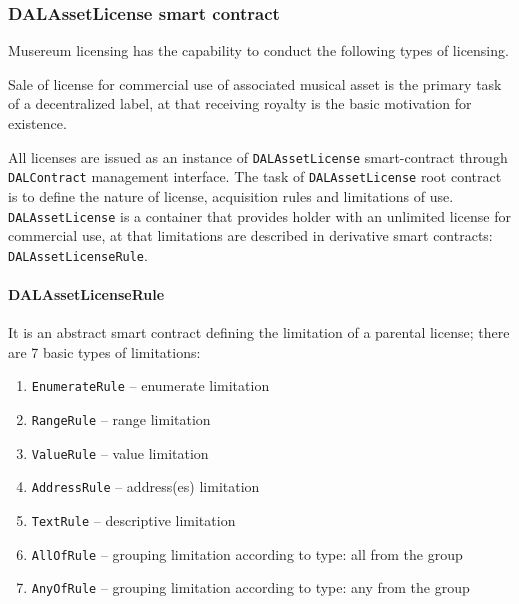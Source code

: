 \documentclass[12pt]{report}
\newcommand{\hlc}[1]{\colorbox{white!25}{#1}}
\def\code#1{\colorbox{light-gray}{\texttt{#1}}}
\begin{document}
\subsubsection{DALAssetLicense smart contract}
\label{tech-apps-dal-license}

Musereum licensing has the capability to conduct the following types of licensing.

Sale of license for commercial use of associated musical asset is the primary task of a decentralized label, at that receiving royalty is the basic motivation for existence.

All licenses are issued as \hlc{an instance} of \code{DALAssetLicense} smart-contract through \code{DALContract} management interface.
The task of \code{DALAssetLicense} root contract is to define the nature of license, acquisition rules and  limitations of use. \code{DALAssetLicense} is a container that provides holder with an unlimited license for commercial use, at that limitations are described in derivative smart contracts:
 \code{DALAssetLicenseRule}.

\paragraph{DALAssetLicenseRule}\hfill\null\linebreak
It is an abstract smart contract defining the limitation of a parental license; there are 7 basic types of limitations:
\begin{enumerate}
	\item \code{EnumerateRule} – enumerate limitation
	\item \code{RangeRule} – range limitation
	\item \code{ValueRule} – value limitation
	\item \code{AddressRule} – address(es) limitation
	\item \code{TextRule} – descriptive limitation
	\item \code{AllOfRule} – grouping limitation according to type: all from the group
	\item \code{AnyOfRule} – grouping limitation according to type: any from the group
\end{enumerate}
\end{document}
